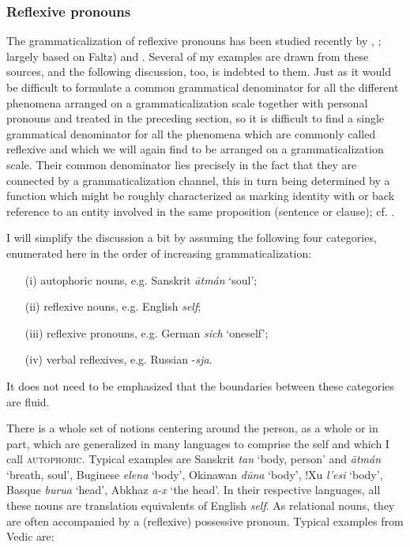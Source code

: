 \subsubsection{Reflexive pronouns} \label{sec:3.2.1.3}
The grammaticalization of reflexive pronouns has been studied recently by \citet[esp. Ch. \textsc{iv}]{Faltz1977}, \citet[640--647]{Edmondson1978}; largely based on Faltz) and \citet{Strunk1980}. Several of my examples are drawn from these sources, and the following discussion, too, is indebted to them. Just as it would be difficult to formulate a common grammatical denominator for all the different phenomena arranged on a grammaticalization scale together with personal pronouns and treated in the preceding section, so it is difficult to find a single grammatical denominator for all the phenomena which are commonly called reflexive and which we will again find to be arranged on a grammaticalization scale. Their common denominator lies precisely in the fact that they are connected by a grammaticalization channel, this in turn being determined by a function which might be roughly characterized as marking identity with or back reference to an entity involved in the same proposition (sentence or clause); cf. \citealt{Plank1979a}.

I will simplify the discussion a bit by assuming the following four categories, enumerated here in the order of increasing grammaticalization:

\begin{enumerate}
 \item[(i)]   autophoric nouns, e.g. Sanskrit \textit{\=atmán} ‘soul’;
 \item[(ii)]  reflexive nouns, e.g. English \textit{self};
 \item[(iii)]  reflexive pronouns, e.g. German \textit{sich} ‘oneself’; 
 \item[(iv)]  verbal reflexives, e.g. Russian -\textit{sja}.              
\end{enumerate}


\noindent It does not need to be emphasized that the boundaries between these categories are fluid.

There is a whole set of notions centering around the person, as a whole or in part, which are generalized in many languages to comprise the self and which I call \textsc{autophoric}. Typical examples are Sanskrit \textit{tan} ‘body, person’ and \textit{\=atmán} ‘breath, soul’, Buginese \textit{elena} ‘body’, Okinawan \textit{d\=una} ‘body’, !Xu \textit{l'esi} ‘body’, Basque \textit{burua} ‘head’, Abkhaz \textit{a-x} ‘the head’. In their respective languages, all these nouns are translation equivalents of English \textit{self}. As relational nouns, they are often accompanied by a (reflexive) possessive pronoun. Typical examples from Vedic \citep[207f]{Delbrück1888} are:

